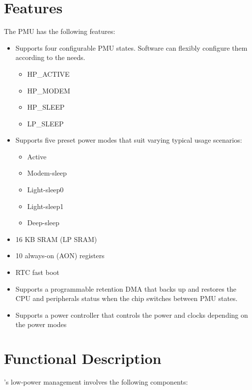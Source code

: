 \documentclass[main\_\_EN.tex]{subfiles}
\begin{document}
\section{Features}

The PMU has the following features:

\begin{itemize}
    \item Supports four configurable PMU states. Software can flexibly configure them according to the needs.
        \begin{itemize}
        \item HP\_ACTIVE
        \item HP\_MODEM
        \item HP\_SLEEP
        \item LP\_SLEEP
        \end{itemize}
    \item Supports five preset power modes that suit varying typical usage scenarios:
    \begin{itemize}
        \item Active
        \item Modem-sleep
        \item Light-sleep0
        \item Light-sleep1
        \item Deep-sleep
    \end{itemize}
    \item 16 KB SRAM (LP SRAM)
    \item 10 always-on (AON) registers
    \item RTC fast boot
    \item Supports a programmable retention DMA that backs up and restores the CPU and peripherals status when the chip switches between PMU states.
    \item Supports a power controller that controls the power and clocks depending on the power modes
\end{itemize}

\section{Functional Description}

\chipname{}'s low-power management involves the following components:
\end{document}
